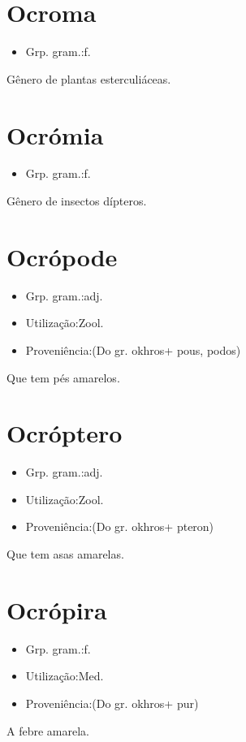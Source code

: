 \section{Ocroma}
\begin{itemize}
\item {Grp. gram.:f.}
\end{itemize}
Gênero de plantas esterculiáceas.
\section{Ocrómia}
\begin{itemize}
\item {Grp. gram.:f.}
\end{itemize}
Gênero de insectos dípteros.
\section{Ocrópode}
\begin{itemize}
\item {Grp. gram.:adj.}
\end{itemize}
\begin{itemize}
\item {Utilização:Zool.}
\end{itemize}
\begin{itemize}
\item {Proveniência:(Do gr. \textunderscore okhros\textunderscore  + \textunderscore pous\textunderscore , \textunderscore podos\textunderscore )}
\end{itemize}
Que tem pés amarelos.
\section{Ocróptero}
\begin{itemize}
\item {Grp. gram.:adj.}
\end{itemize}
\begin{itemize}
\item {Utilização:Zool.}
\end{itemize}
\begin{itemize}
\item {Proveniência:(Do gr. \textunderscore okhros\textunderscore  + \textunderscore pteron\textunderscore )}
\end{itemize}
Que tem asas amarelas.
\section{Ocrópira}
\begin{itemize}
\item {Grp. gram.:f.}
\end{itemize}
\begin{itemize}
\item {Utilização:Med.}
\end{itemize}
\begin{itemize}
\item {Proveniência:(Do gr. \textunderscore okhros\textunderscore  + \textunderscore pur\textunderscore )}
\end{itemize}
A febre amarela.
